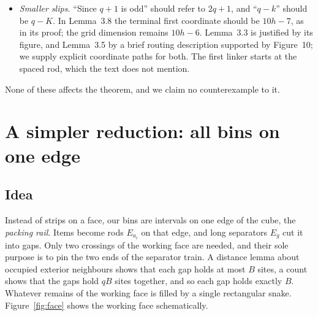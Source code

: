 \documentclass[11pt,letterpaper]{article}
\theoremstyle{definition}
\theoremstyle{remark}
\newcommand{\Hh}{\mathtt{H}}
\newcommand{\Pp}{\mathtt{P}}
\begin{document}
\begin{itemize}
    argument given in Section~\ref{sec:model}. The paper also uses, without stating them, two facts
    about its string on pp.~37--38: the lone $\Hh$'s fill the skeleton while the ribbons fill the face
    sites, and every exterior site adjacent to the cube holds a $\Pp$, except one site next to each
    corner.
  \item \emph{Smaller slips.} ``Since $q+1$ is odd'' should refer to $2q+1$, and ``$q-k$'' should
    be $q-K$. In Lemma~3.8 the terminal first coordinate should be $10h-7$, as in its proof; the grid
    dimension remains $10h-6$. Lemma~3.3 is justified by its figure, and Lemma~3.5 by a brief routing
    description supported by Figure~10; we supply explicit coordinate paths for both. The first
    linker starts at the spaced rod, which the text does not mention.
\end{itemize}
None of these affects the theorem, and we claim no counterexample to it.

\section{A simpler reduction: all bins on one edge}\label{sec:edge}

\subsection{Idea}
Instead of strips on a face, our bins are intervals on one edge of the cube, the \emph{packing
rail}. Items become rods $E_{a_i}$ on that edge, and long separators $E_g$ cut it into gaps. Only two
crossings of the working face are needed, and their sole purpose is to pin the two ends of the
separator train. A distance lemma about occupied exterior neighbours shows that each gap holds at
most $B$ sites, a count shows that the gaps hold $qB$ sites together, and so each gap holds exactly
$B$. Whatever remains of the working face is filled by a single rectangular snake.
Figure~\ref{fig:face} shows the working face schematically.
\end{document}
